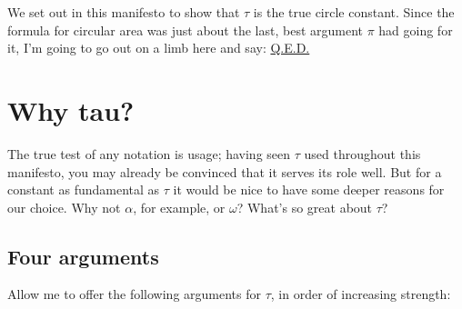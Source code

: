 \documentclass{article}
\begin{document}

We set out in this manifesto to show that $\tau$ is the true circle constant. Since the formula for circular area was just about the last, best argument $\pi$ had going for it, I'm going to go out on a limb here and say: \href{http://en.wikipedia.org/wiki/Q.E.D.}{Q.E.D.}


\section{Why tau?} %
\label{sec:why_tau}

The true test of any notation is usage; having seen $\tau$ used throughout this manifesto, you may already be convinced that it serves its role well. But for a constant as fundamental as $\tau$ it would be nice to have some deeper reasons for our choice. Why not $\alpha$, for example, or $\omega$? What's so great about $\tau$?

  \subsection{Four arguments} %

Allow me to offer the following arguments for $\tau$, in order of increasing strength:
\end{document}
